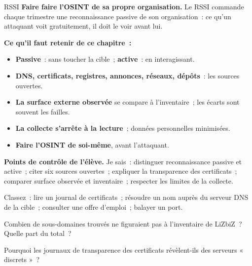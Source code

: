 \begin{boxmetier}{RSSI}
\textbf{Faire faire l'OSINT de sa propre organisation.} Le RSSI commande
chaque trimestre une reconnaissance passive de son organisation~: ce qu'un
attaquant voit gratuitement, il doit le voir avant lui.
\end{boxmetier}

\separateur

\begin{boxresume}
\textbf{Ce qu'il faut retenir de ce chapitre~:}
\begin{itemize}
    \item \textbf{Passive}~: sans toucher la cible~; \textbf{active}~: en
          interagissant.
    \item \textbf{DNS, certificats, registres, annonces, réseaux, dépôts}~:
          les sources ouvertes.
    \item \textbf{La surface externe observée} se compare à l'inventaire~;
          les écarts sont souvent les failles.
    \item \textbf{La collecte s'arrête à la lecture}~; données personnelles
          minimisées.
    \item \textbf{Faire l'OSINT de soi-même}, avant l'attaquant.
\end{itemize}
\end{boxresume}

\begin{boxinfo}
\textbf{Points de contrôle de l'élève.} Je sais~: distinguer reconnaissance
passive et active~; citer six sources ouvertes~; expliquer la transparence
des certificats~; comparer surface observée et inventaire~; respecter les
limites de la collecte.
\end{boxinfo}

\bigskip

\begin{boxexo}[title={\ding{45}\quad Exercice~5.1. Passive ou active \niveaubase}]
Classez~: lire un journal de certificats~; résoudre un nom auprès du
serveur DNS de la cible~; consulter une offre d'emploi~; balayer un port.
\end{boxexo}

\begin{boxexo}[title={\ding{45}\quad Exercice~5.2. L'écart \niveaubase}]
Combien de sous-domaines trouvés ne figuraient pas à l'inventaire de
LiZbiZ~? Quelle part du total~?
\end{boxexo}

\begin{boxexo}[title={\ding{45}\quad Exercice~5.3. Les certificats \niveaubase}]
Pourquoi les journaux de transparence des certificats révèlent-ils des
serveurs « discrets »~?
\end{boxexo}

